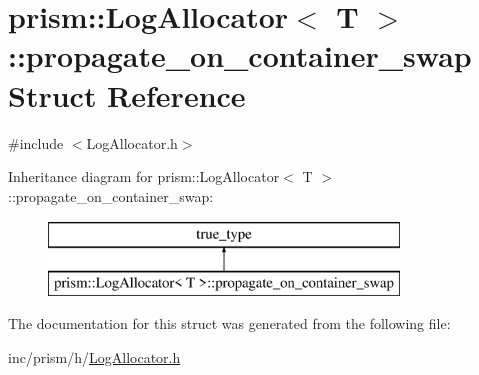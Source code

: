 \hypertarget{structprism_1_1_log_allocator_1_1propagate__on__container__swap}{}\section{prism\+:\+:Log\+Allocator$<$ T $>$\+:\+:propagate\+\_\+on\+\_\+container\+\_\+swap Struct Reference}
\label{structprism_1_1_log_allocator_1_1propagate__on__container__swap}


{\ttfamily \#include $<$Log\+Allocator.\+h$>$}

Inheritance diagram for prism\+:\+:Log\+Allocator$<$ T $>$\+:\+:propagate\+\_\+on\+\_\+container\+\_\+swap\+:\begin{figure}[H]
\begin{center}
\leavevmode
\includegraphics[height=2.000000cm]{structprism_1_1_log_allocator_1_1propagate__on__container__swap}
\end{center}
\end{figure}


The documentation for this struct was generated from the following file\+:\begin{DoxyCompactItemize}
\item 
inc/prism/h/\hyperlink{_log_allocator_8h}{Log\+Allocator.\+h}\end{DoxyCompactItemize}
